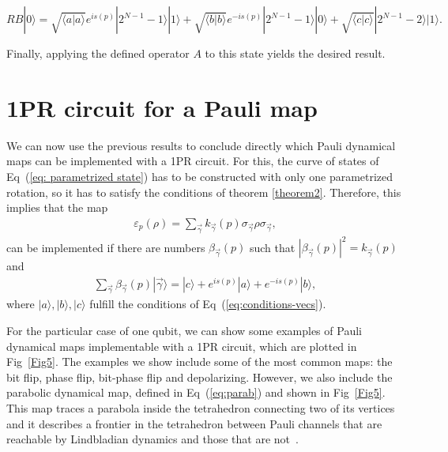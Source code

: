 \documentclass[10pt,letterpaper]{article} %
\newcommand{\fref}[1]{Fig~\ref{#1}}
\newcommand{\eref}[1]{Eq~(\ref{#1})}
\begin{document}
$$
RB|0\rangle =\sqrt{\langle a | a \rangle} e^{is(p)} |2^{N-1}-1\rangle |1\rangle + \sqrt{\langle b | b \rangle} e^{-is(p)} |2^{N-1}-1\rangle |0\rangle + \sqrt{\langle c | c \rangle} |2^{N-1}-2\rangle |1\rangle.
$$

Finally, applying the defined operator $A$ to this state yields the desired result. 
 
\section{1PR circuit for a Pauli map} %
\label{sec: 1PR circuit for a Pauli map}

We can now use the previous results to conclude directly which Pauli dynamical maps
can be implemented with a 1PR circuit.
For this, the curve of states of \eref{eq: parametrized state} 
has to be constructed with only one parametrized rotation,
so it has to satisfy the conditions of theorem \ref{theorem2}.
Therefore, this implies that the map
\begin{eqnarray}
\varepsilon_p(\rho) = \sum_{\vec{\gamma}} k_{\vec{\gamma}}(p) \sigma_{\vec{\gamma}} \rho \sigma_{\vec{\gamma}},
\end{eqnarray}
can be implemented  if there are numbers $\beta_{\vec{\gamma}}(p)$ such that $|\beta_{\vec{\gamma}}(p)|^2 = k_{\vec{\gamma}}(p)$ and
\begin{eqnarray}
\label{eq:vec}
\sum_{\vec{\gamma}} \beta_{\vec{\gamma}}(p) |\vec{\gamma}\rangle = |c\rangle +  e^{is(p)} |a\rangle + e^{-is(p)}|b\rangle,
\end{eqnarray}
where $|a\rangle,|b\rangle,|c\rangle$ fulfill
the conditions of \eref{eq:conditions-vecs}.

For the particular case of one qubit, we can show some examples of Pauli
dynamical maps implementable with a 1PR circuit, which are plotted in
\fref{Fig5}. 
The examples we show include some of the most common maps: the bit flip, phase flip, bit-phase flip and depolarizing.
However, we also include the parabolic dynamical map,
defined in \eref{eq:parab} and shown in \fref{Fig5}.
This map traces a parabola inside the tetrahedron connecting two of its vertices
and it describes a frontier in the tetrahedron between Pauli channels
that are reachable by Lindbladian dynamics and those that are not~\cite{Davalos}.
\end{document}

